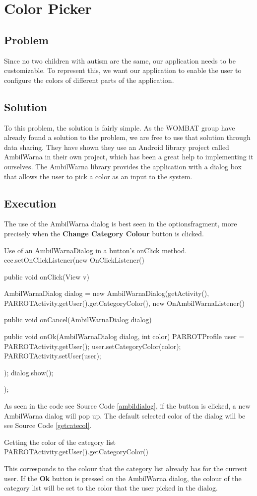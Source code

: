\section{Color Picker}%
\label{colpic}
\subsection*{Problem}
Since no two children with autism are the same, our application needs to be customizable. To represent this, we want our application to enable the user to configure the colors of different parts of the application.

\subsection*{Solution}
To this problem, the solution is fairly simple. As the WOMBAT group have already found a solution to the problem, we are free to use that solution through data sharing. %
They have shown they use an Android library project called AmbilWarna in their own project, which has been a great help to implementing it ourselves. The AmbilWarna library provides the application with a dialog box that allows the user to pick a color as an input to the system.

\subsection*{Execution}{}
The use of the AmbilWarna dialog is best seen in the optionsfragment, more precisely when the \textbf{Change Category Colour} button is clicked.

\begin{source}[{ambildialog}]{Use of an AmbilWarnaDialog in a button's onClick method.}
		ccc.setOnClickListener(new OnClickListener() {
			public void onClick(View v) {
				AmbilWarnaDialog dialog = new AmbilWarnaDialog(getActivity(),
						PARROTActivity.getUser().getCategoryColor(), new OnAmbilWarnaListener() {
					public void onCancel(AmbilWarnaDialog dialog) {
					}

					public void onOk(AmbilWarnaDialog dialog, int color) {
						PARROTProfile user = PARROTActivity.getUser();
						user.setCategoryColor(color);
						PARROTActivity.setUser(user);
					}
				});
				dialog.show();
			}
		});
\end{source}

As seen in the code see Source Code \ref{ambildialog}, if the button is clicked, a new AmbilWarna dialog will pop up. The default selected color of the dialog will be see Source Code \ref{getcatecol}. 
\begin{source}[{getcatecol}]{Getting the color of the category list}
PARROTActivity.getUser().getCategoryColor()
\end{source}
This corresponds to the colour that the category list already has for the current user.\newline
If the \textbf{Ok} button is pressed on the AmbilWarna dialog, the colour of the category list will be set to the color that the user picked in the dialog.

